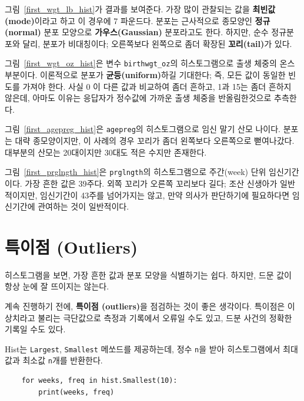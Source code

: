그림~\ref{first_wgt_lb_hist}가 결과를 보여준다.
가장 많이 관찰되는 값을 {\bf 최빈값(mode)}이라고 하고 이 경우에 7 파운드다. 
분포는 근사적으로 종모양인 {\bf 정규(normal)} 분포 모양으로 
{\bf 가우스(Gaussian)} 분포라고도 한다. 하지만, 순수 정규분포와 달리,
분포가 비대칭이다; 오른쪽보다 왼쪽으로 좀더 확장된 {\bf 꼬리(tail)}가 있다.


그림~\ref{first_wgt_oz_hist}은 변수 \verb"birthwgt_oz"의 히스토그램으로 출생 체중의 온스 부분이다. 
이론적으로 분포가 {\bf 균등(uniform)}하길 기대한다; 즉, 모든 값이 동일한 빈도를 가져야 한다.
사실 0 이 다른 값과 비교하여 좀더 흔하고, 1과 15는 좀더 흔하지 않은데, 아마도 이유는 응답자가 정수값에 가까운 출생 체중을 반올림한것으로 추측한다.


그림~\ref{first_agepreg_hist}은 \verb"agepreg"의 히스토그램으로 임신 말기 산모 나이다.
분포는 대략 종모양이지만, 이 사례의 경우 꼬리가 좀더 왼쪽보다 오른쪽으로 뻗여나갔다. 
대부분의 산모는 20대이지만 30대도 적은 수지만 존재한다.

 
그림~\ref{first_prglngth_hist}은 \verb"prglngth"의 히스토그램으로 주간(week) 단위 임신기간이다.
가장 흔한 값은 39주다. 외쪽 꼬리가 오른쪽 꼬리보다 길다; 조산 신생아가 일반적이지만,
임신기간이 43주를 넘어가지는 않고, 만약 의사가 판단하기에 필요하다면 임신기간에 관여하는 것이 일반적이다.



\section{특이점 (Outliers)}

히스토그램을 보면, 가장 흔한 값과 분포 모양을 식별하기는 쉽다. 하지만, 드문 값이 항상 눈에 잘 뜨이지는 않는다.

계속 진행하기 전에, {\bf 특이점 (outliers)}을 점검하는 것이 좋은 생각이다. 특이점은 이상치라고 불리는 극단값으로 측정과 기록에서 오류일 수도 있고, 드분 사건의 정확한 기록일 수도 있다.


Hist는 {\tt Largest}, {\tt Smallest} 메쏘드를 제공하는데, 정수 {\tt n}을 받아 히스토그램에서 최대값과 최소값 {\tt n}개를 반환한다.


\begin{verbatim}
    for weeks, freq in hist.Smallest(10):
        print(weeks, freq)
\end{verbatim}

